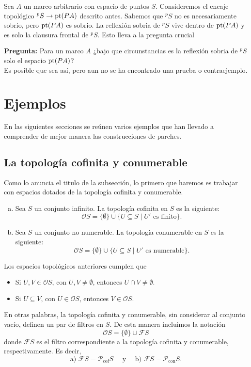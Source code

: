 Sea $A$ un marco arbitrario con espacio de puntos $S$. Consideremos el encaje topológico $^pS\to \mathrm{pt}(PA)$ descrito antes. Sabemos que $^pS$ no es necesariamente sobrio, pero $\mathrm{pt}(PA)$ es sobrio. La reflexión sobria de $^pS$ vive dentro de $\mathrm{pt}(PA)$ y es solo la clausura frontal de $^pS$. Esto lleva a la pregunta crucial

\textbf{Pregunta:} Para un marco $A$ ¿bajo que circunstancias es la reflexión sobria de $^pS$ solo el espacio $\mathrm{pt}(PA)$?\\

Es posible que sea así, pero aun no se ha encontrado una prueba o contraejemplo.

\section{Ejemplos}

En las siguientes secciones se reúnen varios ejemplos que han llevado a comprender de mejor manera las construcciones de parches. 

\subsection{La topología cofinita y conumerable}

Como lo anuncia el titulo de la subsección, lo primero que haremos es trabajar con espacios dotados de la topología cofinita y conumerable.

\begin{dfn}\label{Coficonu}
    \begin{enumerate}[a)]
        \item Sea $S$ un conjunto infinito. La topología cofinita en $S$ es la siguiente:
        \[
        \mathcal{O}S=\{\emptyset\}\cup\{U\subseteq S\mid U' \mbox{ es finito}\}.
        \]
        \item Sea $S$ un conjunto no numerable. La topología conumerable en $S$ es la siguiente:
        \[
        \mathcal{O}S=\{\emptyset\}\cup\{U\subseteq S\mid U' \mbox{ es numerable}\}.
        \]
    \end{enumerate}
\end{dfn}

Los espacios topológicos anteriores cumplen que
\begin{itemize}
    \item Si $U, V\in \mathcal{O}S$, con $U, V\neq \emptyset$, entonces $U\cap V\neq \emptyset$.
    \item Si $U\subseteq V$, con $U\in \mathcal{O}S$, entonces $V\in \mathcal{O}S$.
\end{itemize}
En otras palabras, la topología cofinita y conumerable, sin considerar al conjunto vacío, definen un par de filtros en $S$. De esta manera incluimos la notación
\[
\mathcal{O}S=\{\emptyset\}\cup \mathcal{F}S
\]
donde $\mathcal{F}S$ es el filtro correspondiente a la topología cofinita y conumerable, respectivamente. Es decir,
\[
\mbox{a) }\mathcal{F}S=\mathcal{P}_{\mbox{cof}}S\quad\mbox{ y }\quad\mbox{b) }\mathcal{F}S=\mathcal{P}_{\mbox{con}}S.
\]

